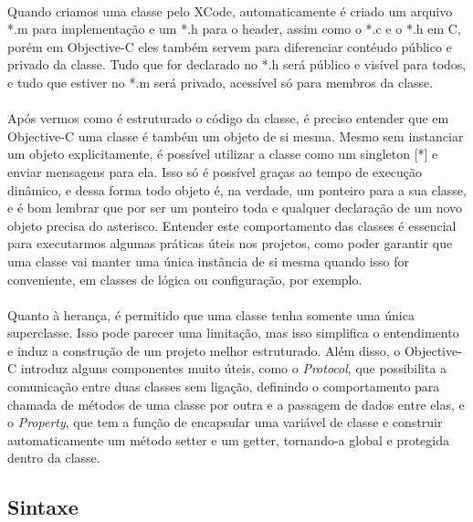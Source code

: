 \documentclass[a4paper,12pt,brazil,doubleside]{book}
\begin{document}
\paragraph{}Quando criamos uma classe pelo XCode, automaticamente é criado um arquivo *.m para implementação e um *.h para o header, assim como o *.c e o *.h em C, porém em Objective-C eles também servem para diferenciar contéudo público e privado da classe. Tudo que for declarado no *.h será público e visível para todos, e tudo que estiver no *.m será privado, acessível só para membros da classe.\\

\paragraph{}Após vermos como é estruturado o código da classe, é preciso entender que em Objective-C uma classe é também um objeto de si mesma. Mesmo sem instanciar um objeto explicitamente, é possível utilizar a classe como um singleton [*] e enviar mensagens para ela. Isso só é possível graças ao tempo de execução dinâmico, e dessa forma todo objeto é, na verdade, um ponteiro para a sua classe, e é bom lembrar que por ser um ponteiro toda e qualquer declaração de um novo objeto precisa do asterisco. Entender este comportamento das classes é essencial para executarmos algumas práticas úteis nos projetos, como poder garantir que uma classe vai manter uma única instância de si mesma quando isso for conveniente, em classes de lógica ou configuração, por exemplo.
\paragraph{}Quanto à herança, é permitido que uma classe tenha somente uma única superclasse. Isso pode parecer uma limitação, mas isso simplifica o entendimento e induz a construção de um projeto melhor estruturado. Além disso, o Objective-C introduz alguns componentes muito úteis, como o \textit{Protocol}, que possibilita a comunicação entre duas classes sem ligação, definindo o comportamento para chamada de métodos de uma classe por outra e a passagem de dados entre elas, e o \textit{Property}, que tem a função de encapsular uma variável de classe e construir automaticamente um método setter e um getter, tornando-a global e protegida dentro da classe.

\bigskip 

\subsection{Sintaxe}
\end{document}
